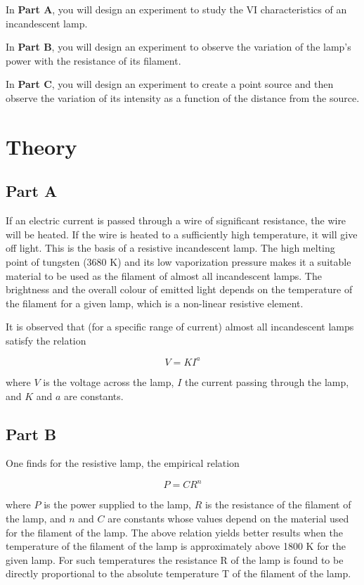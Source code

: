 In \textbf{Part A}, you will design an experiment to study the VI characteristics of an incandescent lamp. 

In \textbf{Part B}, you will design an experiment to observe the variation of the lamp's power with the resistance of its filament. 

In \textbf{Part C}, you will design an experiment to create a point source and then observe the variation of its intensity as a function of the distance from the source. 


\section*{Theory}

\subsection*{Part A}

If an electric current is passed through a wire of significant resistance, the wire will be heated. If the wire is heated to a sufficiently high temperature, it will give off light.  This is the basis of a resistive incandescent lamp. The high melting point of tungsten (3680 K) and its low vaporization pressure makes it a suitable material to be used as the filament of almost all incandescent lamps. The brightness and the overall colour of emitted light depends on the temperature of the filament for a given lamp, which is a non-linear resistive element.

It is observed that (for a specific range of current) almost all incandescent lamps satisfy the relation

\begin{equation*}
V = K I^a
\end{equation*}

where $V$ is the voltage across the lamp, $I$ the current passing through the lamp, and $K$ and $a$ are constants.

\subsection*{Part B}


One finds for the resistive lamp, the empirical relation

\begin{equation*}
P = C R^n
\end{equation*}

where $P$ is the power supplied to the lamp, $R$ is the resistance of the filament of the lamp, and $n$ and $C$ are constants whose values depend on the material used for the filament of the lamp. The above relation yields better results when the temperature of the filament of the lamp is approximately above 1800 K for the given lamp. For such temperatures the resistance R of the lamp is found to be directly proportional to the absolute temperature T of the filament of the lamp.



